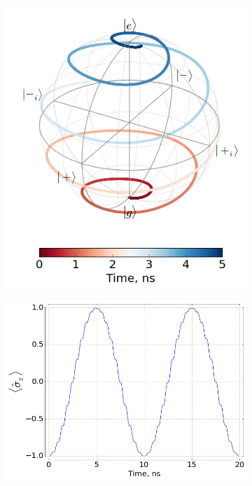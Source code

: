 \documentclass[12pt, twoside]{report}
\numberwithin{equation}{section}
\numberwithin{figure}{section}
\begin{document}
\begin{figure}[h!]
\centering
\begin{subfigure}[t]{0.4\textwidth}
\centering
\includegraphics[height=0.22\textheight]{Pictures/rabi_dynamics_bloch}
\end{subfigure}\quad
\begin{subfigure}[t]{0.5\textwidth}
\centering
\includegraphics[height=0.225\textheight]{Pictures/rabi_dynamics_sz}
\end{subfigure}

\end{figure}
\end{document}
